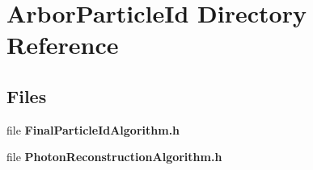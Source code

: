 \section{Arbor\+Particle\+Id Directory Reference}
\label{dir_b86fee647aba023da024df173ba6a6c9}
\subsection*{Files}
\begin{DoxyCompactItemize}
\item 
file {\bf Final\+Particle\+Id\+Algorithm.\+h}
\item 
file {\bf Photon\+Reconstruction\+Algorithm.\+h}
\end{DoxyCompactItemize}
